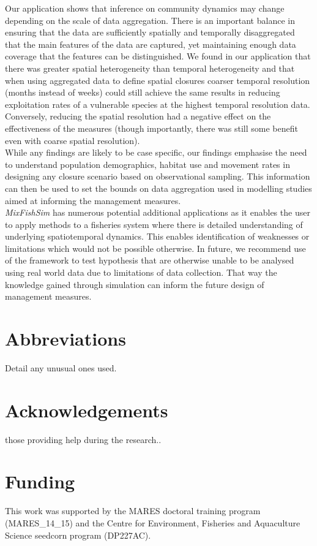 \documentclass[review]{elsarticle}
\begin{document}
Our application shows that inference on community dynamics may change depending
on the scale of data aggregation. There is an important balance in ensuring
that the data are sufficiently spatially and temporally disaggregated that the
main features of the data are captured, yet maintaining enough data coverage
that the features can be distinguished. We found in our application that there
was greater spatial heterogeneity than temporal heterogeneity and that when
using aggregated data to define spatial closures coarser temporal resolution
(months instead of weeks) could still achieve the same results in reducing
exploitation rates of a vulnerable species at the highest temporal resolution
data. Conversely, reducing the spatial resolution had a negative effect on the
effectiveness of the measures (though importantly, there was still some benefit
even with coarse spatial resolution). \\

While any findings are likely to be case specific, our findings emphasise the
need to understand population demographics, habitat use and movement rates in
designing any closure scenario based on observational sampling. This
information can then be used to set the bounds on data aggregation used in
modelling studies aimed at informing the management measures. \\ 

\textit{MixFishSim} has numerous potential additional applications as it
enables the user to apply methods to a fisheries system where there is detailed
understanding of underlying spatiotemporal dynamics. This enables
identification of weaknesses or limitations which would not be possible
otherwise. In future, we recommend use of the framework to test hypothesis that
are otherwise unable to be analysed using real world data due to limitations of
data collection. That way the knowledge gained through simulation can inform
the future design of management measures. 

\section*{Abbreviations} Detail any unusual ones used.

\section*{Acknowledgements} those providing help during the research..

\section*{Funding} This work was supported by the MARES doctoral training
program (MARES\_14\_15) and the Centre for Environment, Fisheries and
Aquaculture Science seedcorn program (DP227AC).
\end{document}
